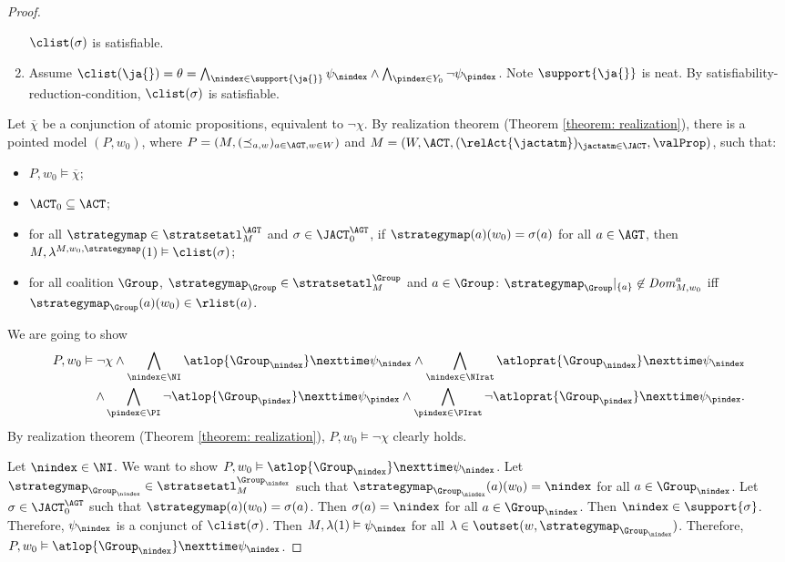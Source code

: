 \begin{proof}
\begin{enumerate}[label={Case \arabic*}]
    $\clist(\sigma)$ is satisfiable.
    \item Assume $\clist(\ja{})=\theta=\bigwedge_{\nindex\in \support{\ja{}}}\psi_\nindex \wedge \bigwedge_{\pindex \in Y_{0}}\neg \psi_\pindex$. Note $\support{\ja{}}$ is neat. By satisfiability-reduction-con\-di\-tion, $\clist(\sigma)$ is satisfiable.
  \end{enumerate}
 
 Let $\overline{\chi }$ be a conjunction of atomic propositions, %
 equivalent to $\neg \chi$. By realization theorem (Theorem \ref{theorem: realization}), there is a pointed model $(P,w_0)$, where $P=( M , {(\preceq_{a,w})_{a\in \AGT, w \in W }})$ and $M=( W, \ACT,\\
 (\relAct{\jactatm} )_{\jactatm \in \JACT},  \valProp )$, such that:
 \begin{itemize}
   \item $P,w_0\vDash \overline{\chi }$;
   \item $\ACT_0\subseteq \ACT$;
   \item for all $\strategymap\in \stratsetatl_{M}^\AGT$ and $\sigma\in\JACT^{\AGT}_0$, if $\strategymap(a)(w_0)=\sigma(a)$ for all $a\in \AGT$, then $M,\lambda^{M,w_0,\strategymap}(1)\vDash \clist(\sigma)$;
   \item for all coalition $\Group$, $\strategymap_{\Group}\in \stratsetatl_{M}^{\Group}$ and $a\in \Group$: $\strategymap_{\Group}|_{\{a\}}\not \in \mathit{Dom}_{M,w_0}^a$ iff $\strategymap_{\Group}(a)(w_0)\in \rlist(a)$.
 \end{itemize}
We are going to show 
\begin{align*}
    P,w_0\vDash \neg \chi \wedge \bigwedge_{\nindex\in \NI}\atlop{\Group_\nindex}\nexttime \psi_\nindex 
 \wedge 
  \bigwedge_{\nindex\in \NIrat}\atloprat{\Group_\nindex}\nexttime \psi_\nindex \\
  \wedge 
  \bigwedge_{\pindex\in \PI}\neg \atlop{\Group_\pindex}\nexttime \psi_\pindex 
  \wedge 
  \bigwedge_{\pindex\in \PIrat}\neg \atloprat{\Group_\pindex}\nexttime \psi_\pindex.
  \end{align*}
  By realization theorem (Theorem \ref{theorem: realization}), $P,w_0\vDash \neg \chi$ clearly holds.

  Let $\nindex\in \NI$. We want to show $P,w_0\vDash \atlop{\Group_\nindex}\nexttime \psi_\nindex $. Let $\strategymap_{\Group_\nindex}\in \stratsetatl^{\Group_\nindex}_{M}$ such that $\strategymap_{\Group_\nindex}(a)(w_0)=\nindex$ for all $a\in \Group_\nindex$. Let $\sigma\in\JACT^{\AGT}_0$ such that $\strategymap(a)(w_0)=\sigma(a)$. Then $\sigma(a)=\nindex$ for all $a\in \Group_\nindex$. Then $\nindex\in \support{\sigma}$. Therefore, $\psi_\nindex$ is a conjunct of $\clist(\sigma)$. Then $M,\lambda(1)\vDash \psi_\nindex$ for all $\lambda\in \outset(w, \strategymap_{\Group_\nindex})$. Therefore, $P,w_0\vDash \atlop{\Group_\nindex}\nexttime \psi_\nindex $. 


\end{proof}
